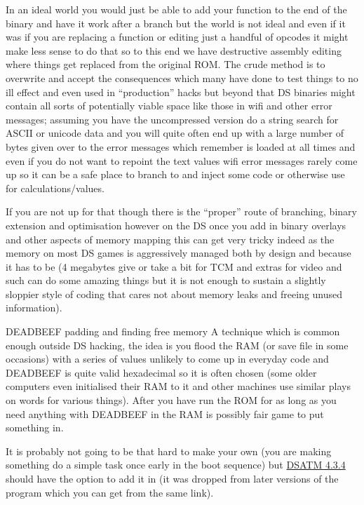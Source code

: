 \documentclass[
]{book}
\begin{document}
In an ideal world you would just be able to add your function to the end of the binary and have it work after a branch but the world is not ideal and even if it was if you are replacing a function or editing just a handful of opcodes it might make less sense to do that so to this end we have destructive assembly editing where things get replaced from the original ROM. The crude method is to overwrite and accept the consequences which many have done to test things to no ill effect and even used in ``production'' hacks but beyond that DS binaries might contain all sorts of potentially viable space like those in wifi and other error messages; assuming you have the uncompressed version do a string search for ASCII or unicode data and you will quite often end up with a large number of bytes given over to the error messages which remember is loaded at all times and even if you do not want to repoint the text values wifi error messages rarely come up so it can be a safe place to branch to and inject some code or otherwise use for calculations/values.

If you are not up for that though there is the ``proper'' route of branching, binary extension and optimisation however on the DS once you add in binary overlays and other aspects of memory mapping this can get very tricky indeed as the memory on most DS games is aggressively managed both by design and because it has to be (4 megabytes give or take a bit for TCM and extras for video and such can do some amazing things but it is not enough to sustain a slightly sloppier style of coding that cares not about memory leaks and freeing unused information).

DEADBEEF padding and finding free memory A technique which is common enough outside DS hacking, the idea is you flood the RAM (or save file in some occasions) with a series of values unlikely to come up in everyday code and DEADBEEF is quite valid hexadecimal so it is often chosen (some older computers even initialised their RAM to it and other machines use similar plays on words for various things). After you have run the ROM for as long as you need anything with DEADBEEF in the RAM is possibly fair game to put something in.

It is probably not going to be that hard to make your own (you are making something do a simple task once early in the boot sequence) but \href{http://filetrip.net/nds-downloads/utilities/download-dsatm-434-f27609.html\%20}{DSATM 4.3.4} should have the option to add it in (it was dropped from later versions of the program which you can get from the same link).
\end{document}
